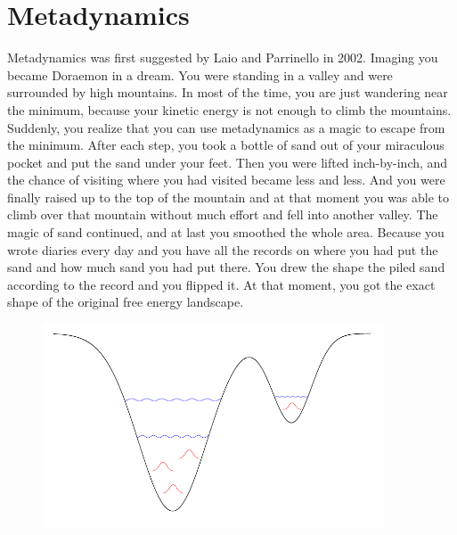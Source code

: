 \section{Metadynamics\label{Sec:ES:metadynamics}}
Metadynamics was first suggested by Laio and Parrinello in 2002.\cite{LaioPNAS2002} Imaging you became Doraemon in a dream. You were standing in a valley and were surrounded by high mountains. In most of the time, you are just wandering near the minimum, because your kinetic energy is not enough to climb the mountains. Suddenly, you realize that you can use metadynamics as a magic to escape from the minimum. After each step, you took a bottle of sand out of your miraculous pocket and put the sand under your feet. Then you were lifted inch-by-inch, and the chance of visiting where you had visited became less and less. And you were finally raised up to the top of the mountain and at that moment you was able to climb over that mountain without much effort and fell into another valley. The magic of sand continued, and at last you smoothed the whole area. Because you wrote diaries every day and you have all the records on where you had put the sand and how much sand you had put there. You drew the shape the piled sand according to the record and you flipped it. At that moment, you got the exact shape of the original free energy landscape. 
\begin{figure}[htbp]
	\includegraphics[width=0.9\textwidth]{figures/metadynamics.pdf}\\
	\caption{}\label{Fig:ES:metadynamics}
\end{figure}